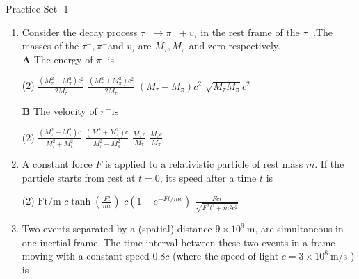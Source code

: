 \newpage
\begin{abox}
	Practice Set -1
	\end{abox}
\begin{enumerate}
	\item Consider the decay process $\tau^{-} \rightarrow \pi^{-}+v_{\tau}$ in the rest frame of the $\tau^{-} .$The masses of the $\tau^{-}, \pi^{-}$and $v_{\tau}$ are $M_{\tau}, M_{\pi}$ and zero respectively.\\
	\textbf{A} The energy of $\pi^{-}$is
	{}
\begin{tasks}(2)
	\task[\textbf{A.}] $\frac{\left(M_{\tau}^{2}-M_{\pi}^{2}\right) c^{2}}{2 M_{\tau}}$
	\task[\textbf{B.}]$\frac{\left(M_{\tau}^{2}+M_{\pi}^{2}\right) c^{2}}{2 M_{\tau}}$
	\task[\textbf{C.}]$\left(M_{\tau}-M_{\pi}\right) c^{2}$
	\task[\textbf{D.}]$\sqrt{M_{\tau} M_{\pi}} c^{2}$
\end{tasks}
\textbf{B} The velocity of  $\pi^{-} \text {is }$
\begin{tasks}(2)
	\task[\textbf{A.}] $\frac{\left(M_{\tau}^{2}-M_{\pi}^{2}\right) c}{M_{\tau}^{2}+M_{\pi}^{2}}$
	\task[\textbf{B.}]$\frac{\left(M_{\tau}^{2}+M_{\pi}^{2}\right) c}{M_{\tau}^{2}-M_{\pi}^{2}}$ 
	\task[\textbf{C.}] $\frac{M_{\pi} c}{M_{\tau}}$
	\task[\textbf{D.}]$\frac{M_{\tau} c}{M_{\pi}}$
\end{tasks}
	\item A constant force $F$ is applied to a relativistic particle of rest mass $m$. If the particle starts from rest at $t=0$, its speed after a time $t$ is
	{}

\begin{tasks}(2)
	\task[\textbf{A.}] $\mathrm{Ft} / \mathrm{m}$
	\task[\textbf{B.}]$c \tanh \left(\frac{F t}{m c}\right)$
	\task[\textbf{C.}]$c\left(1-e^{-F t / m c}\right)$
	\task[\textbf{D.}]$\frac{F c t}{\sqrt{F^{2} t^{2}+m^{2} c^{2}}}$
\end{tasks}
	\item Two events separated by a (spatial) distance $9 \times 10^{9} \mathrm{~m}$, are simultaneous in one inertial frame. The time interval between these two events in a frame moving with a constant speed $0.8 c$ (where the speed of light $c=3 \times 10^{8} \mathrm{~m} / \mathrm{s}$ ) is
	{}


\end{enumerate}
